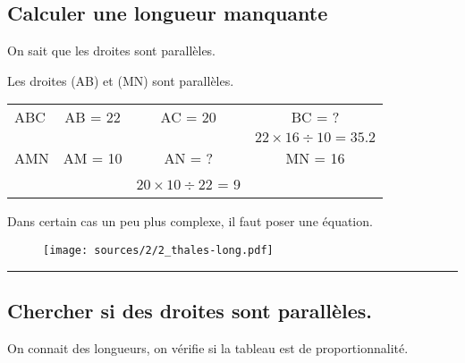 \documentclass[12pt]{article}
\newcommand{\horrule}[1]{\rule{\linewidth}{#1}} %
\begin{document}
\setlength{\columnseprule}{0pt}
\begin{multicols}{2}

  \subsection*{Calculer une longueur manquante}

  On sait que les droites sont parallèles.

  Les droites (AB) et (MN) sont parallèles.


  \begin{tabular}{| l || c | c | c | }
    \hline
    ABC & AB = 22 & AC = 20 & BC = ?                        \\
    &         &         & $22 \times 16 \div 10 = 35.2$ \\
    \hline
    AMN & AM = 10 & AN = ?                     & MN = 16    \\
    &         & $20 \times 10 \div 22$ = 9 &            \\ 
    \hline
  \end{tabular}


  Dans certain cas un peu plus complexe, il faut poser une équation.

  \begin{figure}[H]
    \centering
    \texttt{[image: sources/2/2\_thales-long.pdf]}
  \end{figure}

\end{multicols}

\vspace{-0.5cm}
\horrule{1px}
\vspace{-1cm}

\subsection*{Chercher si des droites sont parallèles.}

On connait des longueurs, on vérifie si la tableau est de proportionnalité.

\setlength{\columnseprule}{1pt}
\end{document}
